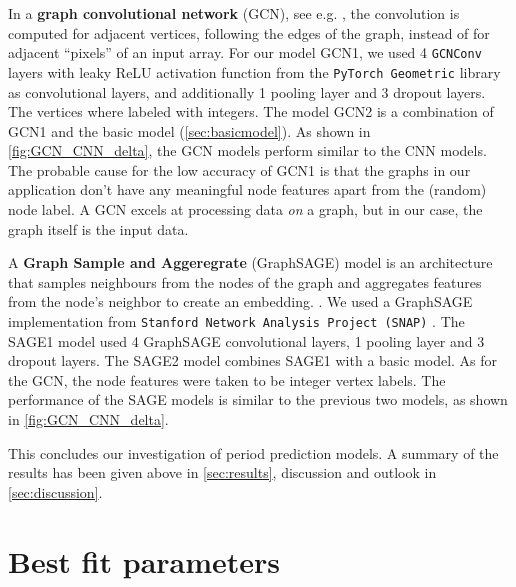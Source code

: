 \documentclass[11pt]{scrartcl}
\numberwithin{equation}{section}
\begin{document}
In a \textbf{graph convolutional network} (GCN), see e.g. \cite{kipf_semisupervised_2017}, the convolution is computed for adjacent vertices, following the edges of the graph, instead of for adjacent \enquote{pixels} of an input array.  
For our model GCN1, we used 4 \texttt{GCNConv} layers with leaky ReLU activation function from the \texttt{PyTorch Geometric} library  as convolutional layers, and additionally 1 pooling layer and 3 dropout layers. The vertices where labeled with integers. The model GCN2 is a combination of GCN1 and the basic model (\cref{sec:basicmodel}). As shown in \cref{fig:GCN_CNN_delta}, the GCN models perform similar to the CNN models. The probable cause for the low accuracy of GCN1 is that the graphs in our application don't have any meaningful node features apart from the (random) node label. A GCN excels at processing data \emph{on} a graph, but in our case, the graph itself is the input data. 






A \textbf{Graph Sample and Aggeregrate} (GraphSAGE) model is an architecture that samples neighbours from the nodes of the graph and aggregates features from the node's neighbor to create an embedding.   \cite{hamilton_inductive_2017a}.  We used a GraphSAGE implementation from \texttt{Stanford Network Analysis Project (SNAP)}  \cite{leskovec_snap_2016}. The SAGE1 model used 4 GraphSAGE convolutional layers, 1 pooling layer and 3 dropout layers. The SAGE2 model combines SAGE1 with a basic model.   As for the GCN, the node features were taken to be integer vertex labels. The performance of the SAGE models is similar to the previous two models, as shown in \cref{fig:GCN_CNN_delta}.


\bigskip
\noindent
This concludes our investigation of period prediction models. A summary of the results has been given above in \cref{sec:results}, discussion and outlook  in \cref{sec:discussion}.



\newpage 

\appendix


\section{Best fit parameters}
\end{document}
